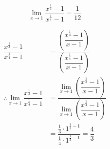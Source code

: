 \documentclass[14pt,fleqn]{extarticle}
\begin{document}
 

\[ \lim_{x\to 1}\dfrac{x^{\frac{1}{3}}-1}{x^{\frac{1}{4}}- 1} = \dfrac{1}{12} \]

\newcard 

\begin{align}
\dfrac{x^{\frac{1}{3}}-1}{x^{\frac{1}{4}}- 1} &= 
\dfrac{\left(\dfrac{x^{\frac{1}{3}}-1}{x-1}\right)}{\left(\dfrac{x^{\frac{1}{4}}- 1}{x-1}\right)} \\
\therefore \lim_{x\to 1}\dfrac{x^{\frac{1}{3}}-1}{x^{\frac{1}{4}}- 1} &= 
\dfrac{\lim_{x\to 1}\left(\dfrac{x^{\frac{1}{3}}-1}{x-1}\right)}{\lim_{x\to 1}\left(\dfrac{x^{\frac{1}{4}}- 1}{x-1}\right)} \\
&= \dfrac{\frac{1}{3}\cdot 1^{\frac{1}{3}-1}}{\frac{1}{4}\cdot 1^{\frac{1}{4}-1}} = \dfrac{4}{3}
\end{align}
\end{document}

